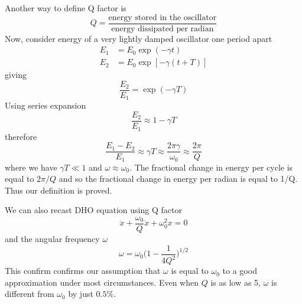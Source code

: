 \documentclass[../../../main.tex]{subfiles}
\begin{document}
Another way to define Q factor is 
\begin{equation*}
    Q=\frac{\text{energy stored in the oscillator}}{\text{energy dissipated per radian}}
\end{equation*}
Now, consider energy of a very lightly damped oscillator one period apart 
\begin{align*}
    E_1&=E_0\exp(-\gamma t) \\
    E_2&=E_0\exp[-\gamma (t+T)]
\end{align*}
giving
\begin{equation*}
    \frac{E_2}{E_1}=\exp(-\gamma T)
\end{equation*}
Using series expansion
\begin{equation*}
    \frac{E_2}{E_1}\approx1-\gamma T
\end{equation*}
therefore
\begin{equation*}
    \frac{E_1-E_2}{E_1}\approx\gamma T\approx\frac{2\pi\gamma}{\omega_0}\approx\frac{2\pi}{Q}
\end{equation*}
where we have $\gamma T\ll 1$ and $\omega\approx\omega_0$. The fractional change in energy per cycle is equal to $2\pi/Q$ and so the fractional change in energy per radian is equal to 1/Q. Thus our definition is proved.

We can also recast DHO equation using Q factor
\begin{equation*}
    \ddot{x}+\frac{\omega_0}{Q}\dot{x}+\omega_0^2x=0
\end{equation*}
and the angular frequency $\omega$
\begin{equation*}
    \omega =\omega_0\biggl(1-\frac{1}{4Q^2}\biggr)^{1/2}
\end{equation*}
This confirm confirms our assumption that $\omega$ is equal to $\omega_0$ to a good approximation under most circumstances. Even when $Q$ is as low as 5, $\omega$ is different from $\omega_0$ by just $0.5\%$.
\end{document}
